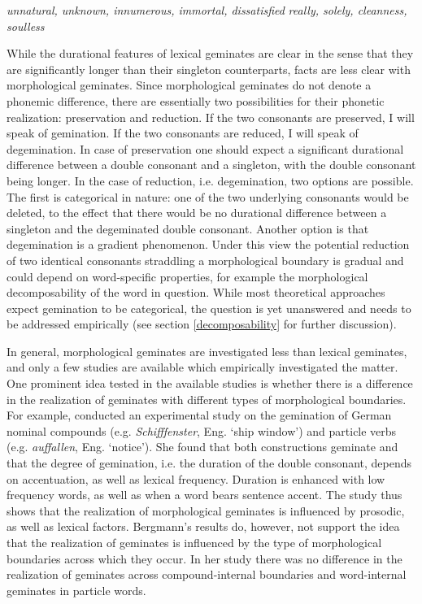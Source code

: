 \begin{exe} 
	\ex \label{example gemination 1} \textit{unnatural, unknown, innumerous, immortal, dissatisfied}
	\ex \label{example gemination 2}\textit{really, solely, cleanness, soulless}
\end{exe}

While the durational features of lexical geminates are clear in the sense that they are significantly longer than their singleton counterparts, facts are less clear with morphological geminates. Since morphological geminates do not denote a phonemic difference, there are essentially two possibilities for their phonetic realization: preservation and reduction. If the two consonants are preserved, I will speak of gemination. If the two consonants are reduced, I will speak of degemination. 
In case of preservation one should expect a significant durational difference between a double consonant and a singleton, with the double consonant being longer.	
In the case of reduction, i.e. degemination, two options are possible. The first is categorical in nature: one of the two underlying consonants would be deleted, to the effect that there would be no durational difference between a singleton and the degeminated double consonant.
Another option is that degemination is a gradient phenomenon. Under this view the potential reduction of two identical consonants straddling a morphological boundary is gradual and could depend on word-specific properties, for example the morphological decomposability of the word in question. 
While most theoretical approaches expect gemination to be categorical, the question is yet unanswered and needs to be addressed empirically (see section \ref{decomposability} for further discussion).

In general, morphological geminates are investigated less than lexical geminates, and only a few studies are available which empirically investigated the matter. One prominent idea tested in the available studies is whether there is a difference in the realization of geminates with different types of morphological boundaries.
 For example, \cite{Bergmann.2017} conducted an experimental study on the gemination of German nominal compounds (e.g. \textit{Schifffenster}, Eng. ‘{ship window}') and  particle verbs (e.g. \textit{auffallen}, Eng.  ‘{notice}'). She found that both constructions geminate and that the degree of gemination, i.e. the duration of the double consonant, depends on accentuation, as well as lexical frequency. Duration is enhanced with low frequency words, as well as when a word bears sentence accent. The study thus shows that the realization of morphological geminates is influenced by prosodic, as well as lexical factors. Bergmann's results do, however, not support the idea that the realization of geminates is influenced by the type of morphological boundaries across which they occur. In her study there was no difference in the realization of geminates across compound-internal boundaries and word-internal geminates in particle words.


